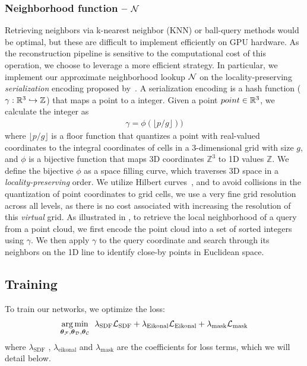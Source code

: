 \subsubsection{Neighborhood function \texorpdfstring{ -- $\mathcal{N}$}{}}
\label{sec:neighbor_func}
Retrieving neighbors via k-nearest neighbor (KNN) or ball-query methods would be optimal, but these are difficult to implement efficiently on GPU hardware.
As the reconstruction pipeline is sensitive to the computational cost of this operation, we choose to leverage a more efficient strategy.
In particular, we implement our approximate neighborhood lookup $\mathcal{N}$ on the locality-preserving \textit{serialization} encoding proposed by~\cite{wang2023octformer, wu2024point}. 
A serialization encoding is a hash function ($\gamma: \mathbb{R}^3 \hookrightarrow \mathbb{Z} $) that maps a point to a integer.
Given a point $point \in \mathbb{R}^{3}$, we calculate the integer as 
\begin{align} 
\gamma = \phi(\lfloor{ p/g }\rfloor))
\end{align}
where $\lfloor{ p/g }\rfloor$ is a floor function that quantizes a point with real-valued coordinates to the integral coordinates of cells in a 3-dimensional grid with size $g$, and $\phi$ is a bijective function that maps 3D coordinates $\mathbb{Z}^3$ to 1D values $\mathbb{Z}$. 
We define the bijective $\phi$ as a space filling curve, which traverses 3D space in a \textit{locality-preserving} order. 
We utilize Hilbert curves~\cite{hilbert1935stetige}, and to avoid collisions in the quantization of point coordinates to grid cells, we use a very fine grid resolution across all levels, as there is no cost associated with increasing the resolution of this \textit{virtual} grid.
As illustrated in , to retrieve the local neighborhood of a query from a point cloud, we first encode the point cloud into a set of sorted integers using $\gamma$.
We then apply $\gamma$ to the query coordinate and search through its neighbors on the 1D line to identify close-by points in Euclidean space.

\subsection{Training}
To train our networks, we optimize the loss:
\begin{align}    
\operatorname*{arg\,min}_{\boldsymbol{\theta}_{\mathcal{F}}, \boldsymbol{\theta}_{\mathcal{D}}, \boldsymbol{\theta}_{\mathcal{C}}}  \:\: \lambda_{\text{SDF}} \mathcal{L}_\text{SDF} + \lambda_{\text{Eikonal}} \mathcal{L}_\text{Eikonal} + \lambda_{\text{mask}} \mathcal{L}_\text{mask}
\end{align}
where $\lambda_{\text{SDF}}$ , $\lambda_{\text{eikonal}}$ and $\lambda_{\text{mask}}$ are the coefficients for loss terms, which we will detail below. 

